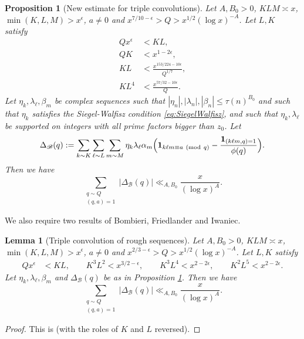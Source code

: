 \documentclass[10pt]{amsart}
\theoremstyle{plain}
\newtheorem{lmm}[thrm]{Lemma}
\newtheorem{prpstn}[thrm]{Proposition}
\numberwithin{equation}{section}
\newcommand{\Mod}[1]{\ (\mathrm{mod}\ #1)}
\begin{document}
\begin{prpstn}[New estimate for triple convolutions]\label{prpstn:TripleRough}
Let $A,B_0>0$, $K L M\asymp x$, $\min(K,L,M)>x^\epsilon$, $a\ne 0$ and $x^{7/10-\epsilon}>Q>x^{1/2}(\log{x})^{-A}$. Let $L,K$ satisfy
\begin{align*}
Q x^\epsilon&<KL,\\
Q K&<x^{1-2\epsilon},\\
KL &< \frac{x^{153/224-10\epsilon}}{Q^{1/7}},\\
K L^{4}&<\frac{x^{57/32-10\epsilon}}{Q}.
\end{align*}
Let $\eta_k,\lambda_\ell,\beta_m$ be complex sequences such that $|\eta_n|,|\lambda_n|,|\beta_n|\le \tau(n)^{B_0}$ and such that $\eta_k$ satisfies the Siegel-Walfisz condition \eqref{eq:SiegelWalfisz}, and such that $\eta_k,\lambda_\ell$ be supported on integers with all prime factors bigger than $z_0$. Let 
\[
\Delta_{\mathscr{B}}(q):=\sum_{k\sim K}\sum_{\ell\sim L}\sum_{m\sim M}\eta_k\lambda_\ell\alpha_m\Bigl(\mathbf{1}_{k \ell m\equiv a\Mod{q}}-\frac{\mathbf{1}_{(k \ell m,q)=1}}{\phi(q)}\Bigr).
\]
Then we have
\[
\sum_{\substack{q\sim Q\\ (q,a)=1}}|\Delta_{\mathscr{B}}(q)|\ll_{A,B_0} \frac{x}{(\log{x})^A}.
\]
\end{prpstn}
%
%
%
%
%
%
%
%
We also require two results of Bombieri, Friedlander and Iwaniec.
%
%
%
%
%
%
%
%
\begin{lmm}[Triple convolution of rough sequences]\label{lmm:BFITripleRough}
Let $A,B_0>0$, $K L M\asymp x$, $\min(K,L,M)>x^\epsilon$, $a\ne 0$ and $x^{2/3-\epsilon}>Q>x^{1/2}(\log{x})^{-A}$. Let $L,K$ satisfy
\begin{align*}
Q x^\epsilon&<KL,\qquad
K^3 L^2<x^{3/2-\epsilon},\qquad
K^3 L^4< x^{2-2\epsilon},\qquad
K^2 L^5 <x^{2-2\epsilon}.
\end{align*}
Let $\eta_k,\lambda_\ell,\beta_m$ and $\Delta_{\mathscr{B}}(q)$ be as in Proposition \ref{prpstn:TripleRough}. Then we have
\[
\sum_{\substack{q\sim Q\\ (q,a)=1}}|\Delta_{\mathscr{B}}(q)|\ll_{A,B_0} \frac{x}{(\log{x})^A}.
\]
\end{lmm}
%
%
%
%
\begin{proof}
This is \cite[Theorem 3]{BFI2} (with the roles of $K$ and $L$ reversed).
\end{proof}
%
%
%
%
%
%
%
%
\end{document}
